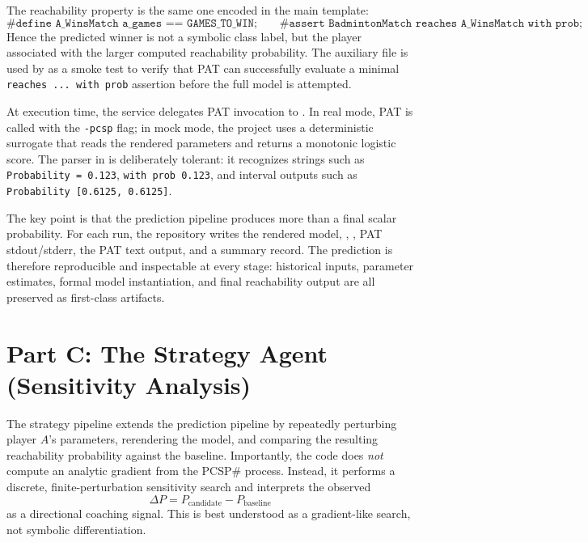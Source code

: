 \documentclass{article}
\begin{document}
The reachability property is the same one encoded in the main template:
\[
\texttt{\#define A\_WinsMatch a\_games == GAMES\_TO\_WIN;}
\qquad
\texttt{\#assert BadmintonMatch reaches A\_WinsMatch with prob;}
\]
Hence the predicted winner is not a symbolic class label, but the player associated with the larger computed reachability probability. The auxiliary file  is used by  as a smoke test to verify that PAT can successfully evaluate a minimal \texttt{reaches ... with prob} assertion before the full model is attempted.

At execution time, the service delegates PAT invocation to . In real mode, PAT is called with the \texttt{-pcsp} flag; in mock mode, the project uses a deterministic surrogate that reads the rendered parameters and returns a monotonic logistic score. The parser in  is deliberately tolerant: it recognizes strings such as \texttt{Probability = 0.123}, \texttt{with prob 0.123}, and interval outputs such as \texttt{Probability [0.6125, 0.6125]}.

The key point is that the prediction pipeline produces more than a final scalar probability. For each run, the repository writes the rendered  model, , , PAT stdout/stderr, the PAT text output, and a summary record. The prediction is therefore reproducible and inspectable at every stage: historical inputs, parameter estimates, formal model instantiation, and final reachability output are all preserved as first-class artifacts.

\section{Part C: The Strategy Agent (Sensitivity Analysis)}
The strategy pipeline extends the prediction pipeline by repeatedly perturbing player \(A\)'s parameters, rerendering the model, and comparing the resulting reachability probability against the baseline. Importantly, the code does \emph{not} compute an analytic gradient from the PCSP\# process. Instead, it performs a discrete, finite-perturbation sensitivity search and interprets the observed
\[
\Delta P = P_{\text{candidate}} - P_{\text{baseline}}
\]
as a directional coaching signal. This is best understood as a gradient-like search, not symbolic differentiation.
\end{document}
